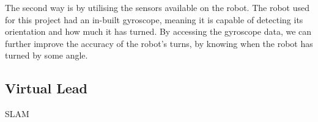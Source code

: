 \documentclass{l4proj}
\begin{document}
The second way is by utilising the sensors available on the robot. The robot used for this project had an in-built gyroscope, meaning it is capable of detecting its orientation and how much it has turned. By accessing the gyroscope data, we can further improve the accuracy of the robot's turns, by knowing when the robot has turned by some angle.

\subsection{Virtual Lead}

SLAM


%
% 
\end{document}
